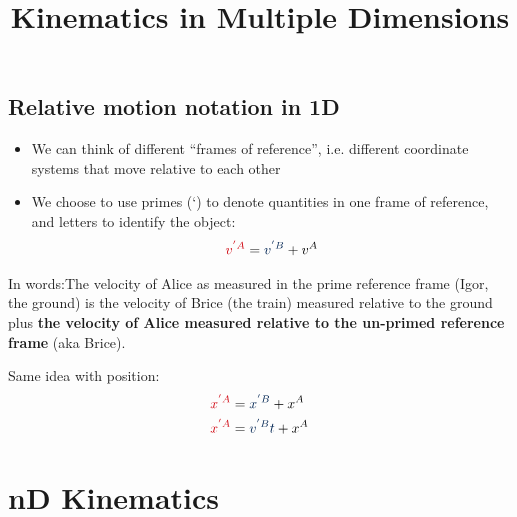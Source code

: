 \documentclass[aspectratio=169,
hyperref={colorlinks,urlcolor=blue}
]{beamer}
\begin{document}
\subsection{Relative motion notation in 1D}
\label{subsec:relmotionnotation1d}
{
\begin{itemize}
\item We can think of different ``frames of reference'', i.e. different coordinate systems that move relative to each other
\item We choose to use primes (‘) to denote quantities in one frame of reference, and letters to identify the object:
\begin{align*}
\textcolor{myred}{v^{'A}}=\textcolor{myblue}{v^{'B}}+v^A
\end{align*}
\end{itemize}


In words:\textcolor{myred}{The velocity of Alice as measured in the prime reference frame (Igor, the ground)} \textcolor{myblue}{is the velocity of Brice (the train) measured relative to the ground} plus \textbf{the velocity of Alice measured relative to the un-primed reference frame} (aka Brice).
}
{
Same idea with position:
\begin{align*}
\textcolor{myred}{x^{'A}}&=\textcolor{myblue}{x^{'B}}+x^A\\
\textcolor{myred}{x^{'A}}&=\textcolor{myblue}{v^{'B}t}+x^A
\end{align*}
}







\section{nD Kinematics}
\label{sec:ndkinematics}
\title{Kinematics in Multiple Dimensions}
\author{\insertsubsection}


\begin{frame}
\titlepage
\thispagestyle{empty}
\end{frame}
\end{document}
